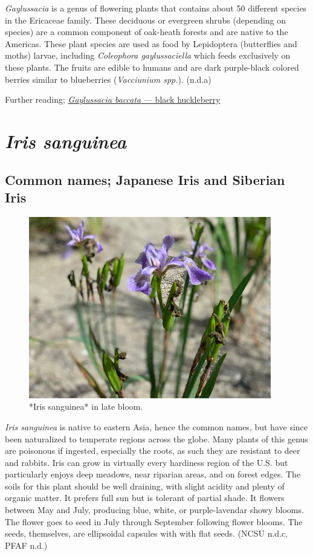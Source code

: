 \documentclass[
]{article}
\begin{document}
\emph{Gaylussacia} is a genus of flowering plants that contains about 50 different species in the Ericaceae family. These deciduous or evergreen shrubs (depending on species) are a common component of oak-heath forests and are native to the Americas. These plant species are used as food by Lepidoptera (butterflies and moths) larvae, including \emph{Coleophora gaylussaciella} which feeds exclusively on these plants. The fruits are edible to humans and are dark purple-black colored berries similar to blueberries (\emph{Vacciunium spp.}). (n.d.a)

Further reading; \href{https://www.fs.fed.us/wildflowers/beauty/mycotrophic/monotropa_hypopitys.shtml}{\emph{Gaylussacia baccata} --- black huckleberry}

\hypertarget{iris-sanguinea}{%
\section{\texorpdfstring{\emph{Iris sanguinea}}{Iris sanguinea}}\label{iris-sanguinea}}

\hypertarget{common-names-japanese-iris-and-siberian-iris}{%
\subsection{Common names; Japanese Iris and Siberian Iris}\label{common-names-japanese-iris-and-siberian-iris}}

\begin{figure}

{\centering \includegraphics[width=0.5\linewidth]{irissan} 

}

\caption{*Iris sanguinea* in late bloom.}\label{fig:iris}
\end{figure}

\emph{Iris sanguinea} is native to eastern Asia, hence the common names, but have since been naturalized to temperate regions across the globe. Many plants of this genus are poisonous if ingested, especially the roots, as such they are resistant to deer and rabbits. Iris can grow in virtually every hardiness region of the U.S. but particularly enjoys deep meadows, near riparian areas, and on forest edges. The soils for this plant should be well draining, with slight acidity and plenty of organic matter. It prefers full sun but is tolerant of partial shade. It flowers between May and July, producing blue, white, or purple-lavendar showy blooms. The flower goes to seed in July through September following flower blooms. The seeds, themselves, are ellipsoidal capsules with with flat seeds. (NCSU n.d.c, PFAF n.d.)
\end{document}
